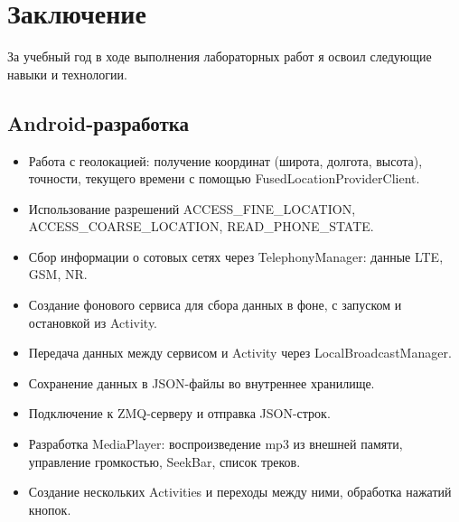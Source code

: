 \chapter{Заключение}
\label{ch:final}

За учебный год в ходе выполнения лабораторных работ я освоил следующие навыки и технологии.

\section*{Android-разработка}
\begin{itemize}
    \item Работа с геолокацией: получение координат (широта, долгота, высота), точности, текущего времени с помощью FusedLocationProviderClient.
    \item Использование разрешений ACCESS\_FINE\_LOCATION, ACCESS\_COARSE\_LOCATION, READ\_PHONE\_STATE.
    \item Сбор информации о сотовых сетях через TelephonyManager: данные LTE, GSM, NR.
    \item Создание фонового сервиса для сбора данных в фоне, с запуском и остановкой из Activity.
    \item Передача данных между сервисом и Activity через LocalBroadcastManager.
    \item Сохранение данных в JSON-файлы во внутреннее хранилище.
    \item Подключение к ZMQ-серверу и отправка JSON-строк.
    \item Разработка MediaPlayer: воспроизведение mp3 из внешней памяти, управление громкостью, SeekBar, список треков.
    \item Создание нескольких Activities и переходы между ними, обработка нажатий кнопок.
\end{itemize}

